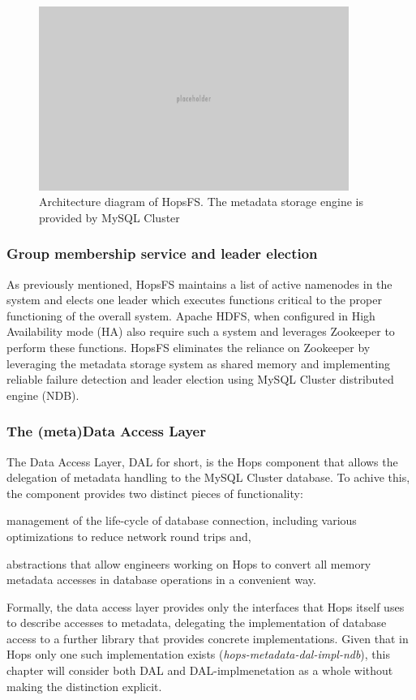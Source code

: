 \begin{figure}[h]
\caption{Architecture diagram of HopsFS. The metadata storage engine is provided by MySQL Cluster}
\label{fig:hopsfs-architecture}
\centering
\includegraphics[width=0.9\textwidth]{images/placeholder.png}
\end{figure}

\subsubsection{Group membership service and leader election}
\label{sec:leader-election}
As previously mentioned, HopsFS maintains a list of active namenodes in the system and elects one leader which executes functions critical to the proper functioning of the overall system.
Apache HDFS, when configured in High Availability mode (HA) also require such a system and leverages Zookeeper to perform these functions.
HopsFS eliminates the reliance on Zookeeper by leveraging the metadata storage system as shared memory and implementing reliable failure detection and leader election \cite{DBLP:conf/dais/NiaziIBD15} using MySQL Cluster distributed engine (NDB).
\cite{DBLP:journals/jacm/ChandraHT96}

\subsubsection{The (meta)Data Access Layer}
The Data Access Layer, DAL for short, is the Hops component that allows the delegation of metadata handling to the MySQL Cluster database.
To achive this, the component provides two distinct pieces of functionality:
\begin{inparaenum}[i)]
    \item management of the life-cycle of database connection, including various optimizations to reduce network round trips and,
    \item abstractions that allow engineers working on Hops to convert all memory metadata accesses in database operations in a convenient way.
\end{inparaenum}
Formally, the data access layer provides only the interfaces that Hops itself uses to describe accesses to metadata, delegating the implementation of database access to a further library that provides concrete implementations.
Given that in Hops only one such implementation exists (\textit{hops-metadata-dal-impl-ndb}), this chapter will consider both DAL and DAL-implmenetation as a whole without making the distinction explicit.

